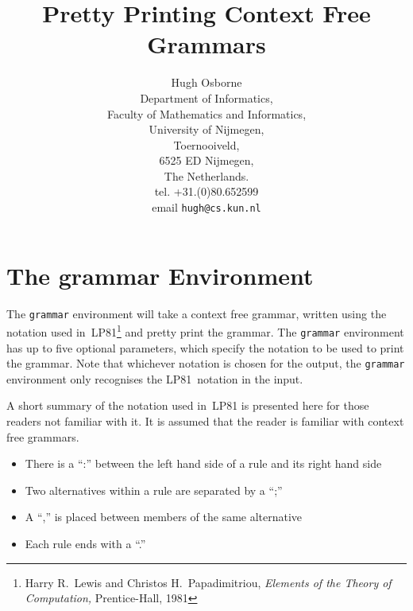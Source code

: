 \title{Pretty Printing Context Free Grammars}
\author{Hugh Osborne\\
        Department of Informatics,\\
        Faculty of Mathematics and Informatics,\\
        University of Nijmegen,\\
        Toernooiveld,\\
        6525 ED Nijmegen,\\
        The Netherlands.\\
        tel. +31.(0)80.652599\\
        email {\tt hugh@cs.kun.nl}}


\maketitle
\section{The grammar Environment}
The {\tt grammar}
environment will take a context free grammar, written using the notation
used in~LP81\footnote{Harry R.\ Lewis and Christos H.\ 
Papadimitriou, {\sl Elements of the Theory of Computation,}
Prentice-Hall, 1981} and pretty print the grammar. The {\tt grammar}
environment has up to five optional parameters, which specify the notation to
be used to print the grammar. Note that whichever notation is chosen for
the output, the {\tt grammar} environment only recognises the LP81~notation in the input.

A short summary of the notation used in~LP81 is presented here for
those readers not familiar with it. It is assumed that the reader is
familiar with context free grammars.
\begin{itemize}
 \item There is a ``:'' between the left hand side of a rule and its right hand side
 \item Two alternatives within a rule are separated by a ``;''
 \item A ``,'' is placed between members of the same alternative
 \item Each rule ends with a ``.''
\end{itemize}

